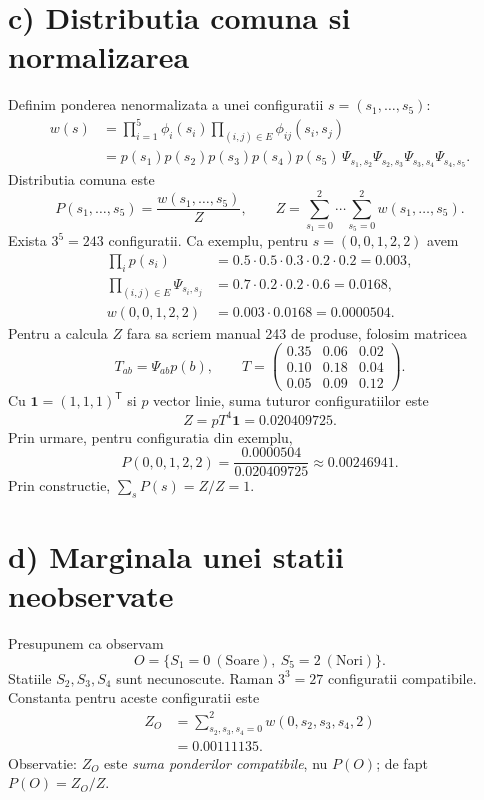 \documentclass[11pt,a4paper]{article}
\begin{document}
\section*{c) Distributia comuna si normalizarea}
Definim ponderea nenormalizata a unei configuratii $s=(s_1,\ldots,s_5)$:
\begin{align*}
w(s)&=\prod_{i=1}^{5}\phi_i(s_i)\prod_{(i,j)\in E}\phi_{ij}(s_i,s_j)\\
&=p(s_1)p(s_2)p(s_3)p(s_4)p(s_5)\,\Psi_{s_1,s_2}\Psi_{s_2,s_3}\Psi_{s_3,s_4}\Psi_{s_4,s_5}.
\end{align*}
Distributia comuna este
\[
\boxed{P(s_1,\ldots,s_5)=\frac{w(s_1,\ldots,s_5)}{Z}},\qquad
\boxed{Z=\sum_{s_1=0}^{2}\cdots\sum_{s_5=0}^{2}w(s_1,\ldots,s_5)}.
\]
Exista $3^5=243$ configuratii. Ca exemplu, pentru $s=(0,0,1,2,2)$ avem
\begin{align*}
\prod_i p(s_i)&=0.5\cdot0.5\cdot0.3\cdot0.2\cdot0.2=0.003,\\
\prod_{(i,j)\in E}\Psi_{s_i,s_j}&=0.7\cdot0.2\cdot0.2\cdot0.6=0.0168,\\
w(0,0,1,2,2)&=0.003\cdot0.0168=0.0000504.
\end{align*}
Pentru a calcula $Z$ fara sa scriem manual 243 de produse, folosim matricea
\[
T_{ab}=\Psi_{ab}p(b),\qquad
T=\begin{pmatrix}
0.35&0.06&0.02\\
0.10&0.18&0.04\\
0.05&0.09&0.12
\end{pmatrix}.
\]
Cu $\mathbf{1}=(1,1,1)^{\mathsf T}$ si $p$ vector linie, suma tuturor configuratiilor este
\[
Z=pT^4\mathbf{1}=\boxed{0.020409725}.
\]
Prin urmare, pentru configuratia din exemplu,
\[
P(0,0,1,2,2)=\frac{0.0000504}{0.020409725}\approx\boxed{0.00246941}.
\]
Prin constructie, $\sum_s P(s)=Z/Z=1$.

\section*{d) Marginala unei statii neobservate}
Presupunem ca observam
\[
O=\{S_1=0\ (\mathrm{Soare}),\ S_5=2\ (\mathrm{Nori})\}.
\]
Statiile $S_2,S_3,S_4$ sunt necunoscute. Raman $3^3=27$ configuratii compatibile. Constanta pentru aceste configuratii este
\begin{align*}
Z_O&=\sum_{s_2,s_3,s_4=0}^{2}w(0,s_2,s_3,s_4,2)\\
&=\boxed{0.00111135}.
\end{align*}
Observatie: $Z_O$ este \emph{suma ponderilor compatibile}, nu $P(O)$; de fapt $P(O)=Z_O/Z$.
\end{document}
